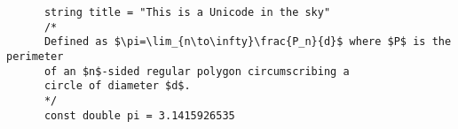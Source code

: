 \documentclass{article}
\begin{document}
    \begin{verbatim}
      string title = "This is a Unicode in the sky"
      /*
      Defined as $\pi=\lim_{n\to\infty}\frac{P_n}{d}$ where $P$ is the perimeter
      of an $n$-sided regular polygon circumscribing a
      circle of diameter $d$.
      */
      const double pi = 3.1415926535
    \end{verbatim}
\end{document}
